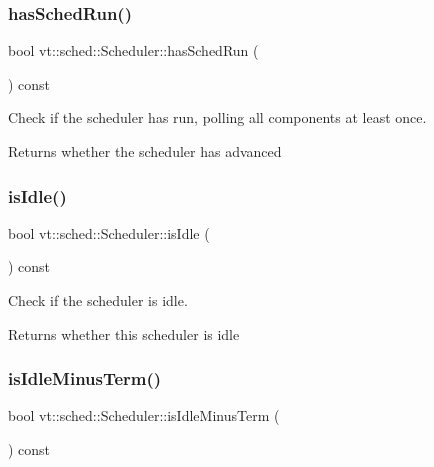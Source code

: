 \subsubsection{\texorpdfstring{has\+Sched\+Run()}{hasSchedRun()}}
{\footnotesize\ttfamily bool vt\+::sched\+::\+Scheduler\+::has\+Sched\+Run (\begin{DoxyParamCaption}{ }\end{DoxyParamCaption}) const\hspace{0.3cm}{\ttfamily [inline]}}



Check if the scheduler has run, polling all components at least once. 

\begin{DoxyReturn}{Returns}
whether the scheduler has advanced 
\end{DoxyReturn}
\mbox{\label{structvt_1_1sched_1_1_scheduler_a047e7a211a220c2729c51c36271c7bf1}} 
\subsubsection{\texorpdfstring{is\+Idle()}{isIdle()}}
{\footnotesize\ttfamily bool vt\+::sched\+::\+Scheduler\+::is\+Idle (\begin{DoxyParamCaption}{ }\end{DoxyParamCaption}) const\hspace{0.3cm}{\ttfamily [inline]}}



Check if the scheduler is idle. 

\begin{DoxyReturn}{Returns}
whether this scheduler is idle 
\end{DoxyReturn}
\mbox{\label{structvt_1_1sched_1_1_scheduler_a3229e007ac15bfb1d337428a52157817}} 
\subsubsection{\texorpdfstring{is\+Idle\+Minus\+Term()}{isIdleMinusTerm()}}
{\footnotesize\ttfamily bool vt\+::sched\+::\+Scheduler\+::is\+Idle\+Minus\+Term (\begin{DoxyParamCaption}{ }\end{DoxyParamCaption}) const\hspace{0.3cm}{\ttfamily [inline]}}



